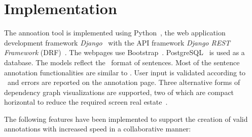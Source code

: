 \section{Implementation}
\label{sec:implementation}

The annoation tool is implemented using  Python~\cite{python}, the web application development framework \textit{Django}~\cite{django} with the API framework \textit{Django REST Framework} (DRF)~\cite{drf}. The webpages use Bootstrap~\cite{bootstrap}.
PostgreSQL~\cite{psql} is used as a database.
The models reflect the \ud\ format of sentences.
Most of the sentence annotation functionalities are similar to \boatvone.
User input is validated according to  \ud\ and errors are reported on the annotation page. 
Three alternative forms of dependency graph visualizations are supported, two of which are compact horizontal to reduce the required screen real estate~\cite{spacy,spyssalo,spyssalo}.


The following features have been implemented to support the creation of valid annotations with increased speed in a collaborative manner:


